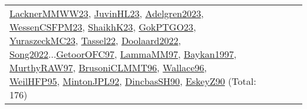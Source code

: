 {\begin{longtable}{p{3cm}r>{\raggedright\arraybackslash}p{6cm}>{\raggedright\arraybackslash}p{6cm}>{\raggedright\arraybackslash}p{8cm}}
\hyperref[detail:LacknerMMWW23]{LacknerMMWW23}, \hyperref[detail:JuvinHL23]{JuvinHL23}, \hyperref[detail:Adelgren2023]{Adelgren2023}, \hyperref[detail:WessenCSFPM23]{WessenCSFPM23}, \hyperref[detail:ShaikhK23]{ShaikhK23}, \hyperref[detail:GokPTGO23]{GokPTGO23}, \hyperref[detail:YuraszeckMC23]{YuraszeckMC23}, \hyperref[detail:Tassel22]{Tassel22}, \hyperref[detail:Doolaard2022]{Doolaard2022}, \hyperref[detail:Song2022]{Song2022}...\hyperref[detail:GetoorOFC97]{GetoorOFC97}, \hyperref[detail:LammaMM97]{LammaMM97}, \hyperref[detail:Baykan1997]{Baykan1997}, \hyperref[detail:MurthyRAW97]{MurthyRAW97}, \hyperref[detail:BrusoniCLMMT96]{BrusoniCLMMT96}, \hyperref[detail:Wallace96]{Wallace96}, \hyperref[detail:WeilHFP95]{WeilHFP95}, \hyperref[detail:MintonJPL92]{MintonJPL92}, \hyperref[detail:DincbasSH90]{DincbasSH90}, \hyperref[detail:EskeyZ90]{EskeyZ90} (Total: 176)\\

\end{longtable}}
